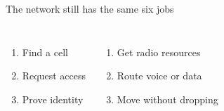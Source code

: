 \begin{frame}{The network still has the same six jobs}
  \vspace{0.5em}
  \begin{columns}[T,onlytextwidth]
      \large
      \begin{enumerate}\itemsep5pt
        \item Find a cell
        \item Request access
        \item Prove identity
      \end{enumerate}
      \large
      \begin{enumerate}\itemsep5pt
        \setcounter{enumi}{3}
        \item Get radio resources
        \item Route voice or data
        \item Move without dropping
      \end{enumerate}
  \end{columns}

  \vspace{1.0em}
\end{frame}
